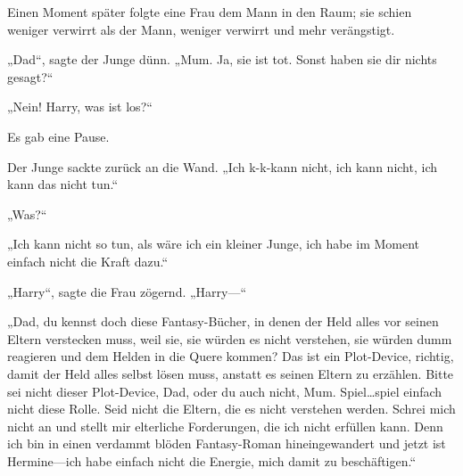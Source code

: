 Einen Moment später folgte eine Frau dem Mann in den Raum; sie schien weniger verwirrt als der Mann, weniger verwirrt und mehr verängstigt.

„Dad“, sagte der Junge dünn. „Mum. Ja, sie ist tot. Sonst haben sie dir nichts gesagt?“

„Nein! Harry, was ist los?“

Es gab eine Pause.

Der Junge sackte zurück an die Wand. „Ich k-k-kann nicht, ich kann nicht, ich kann das nicht tun.“

„Was?“

„Ich kann nicht so tun, als wäre ich ein kleiner Junge, ich habe im Moment einfach nicht die Kraft dazu.“

„Harry“, sagte die Frau zögernd. „Harry—“

„Dad, du kennst doch diese Fantasy-Bücher, in denen der Held alles vor seinen Eltern verstecken muss, weil sie, sie würden es nicht verstehen, sie würden dumm reagieren und dem Helden in die Quere kommen? Das ist ein Plot-Device, richtig, damit der Held alles selbst lösen muss, anstatt es seinen Eltern zu erzählen. Bitte sei nicht dieser Plot-Device, Dad, oder du auch nicht, Mum. Spiel…spiel einfach nicht diese Rolle. Seid nicht die Eltern, die es nicht verstehen werden. Schrei mich nicht an und stellt mir elterliche Forderungen, die ich nicht erfüllen kann. Denn ich bin in einen verdammt blöden Fantasy-Roman hineingewandert und jetzt ist Hermine—ich habe einfach nicht die Energie, mich damit zu beschäftigen.“

